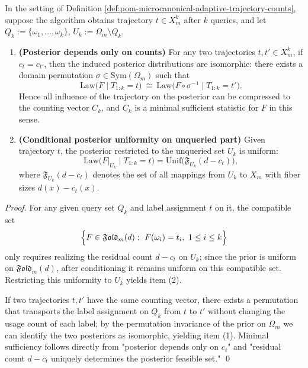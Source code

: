 \begin{theorem}\label{thm:pom-microcanonical-count-sufficient-statistic-posterior-uniform}
In the setting of Definition \ref{def:pom-microcanonical-adaptive-trajectory-counts}, suppose the algorithm obtains trajectory \(t\in X_m^k\) after \(k\) queries, and let \(Q_k:=\{\omega_1,\dots,\omega_k\}\),
\(U_k:=\Omega_m\setminus Q_k\).
\begin{enumerate}
  \item \textbf{(Posterior depends only on counts)}
  For any two trajectories \(t,t'\in X_m^k\), if \(c_t=c_{t'}\), then the induced posterior distributions are isomorphic:
  there exists a domain permutation \(\sigma\in\mathrm{Sym}(\Omega_m)\) such that
  \[
  \mathrm{Law}\bigl(F\mid T_{1:k}=t\bigr)\ \cong\ \mathrm{Law}\bigl(F\circ\sigma^{-1}\mid T_{1:k}=t'\bigr).
  \]
  Hence all influence of the trajectory on the posterior can be compressed to the counting vector \(C_k\), and \(C_k\) is a minimal sufficient statistic for \(F\) in this sense.
  \item \textbf{(Conditional posterior uniformity on unqueried part)}
  Given trajectory \(t\), the posterior restricted to the unqueried set \(U_k\) is uniform:
  \[
  \mathrm{Law}\bigl(F|_{U_k}\mid T_{1:k}=t\bigr)
  =\mathrm{Unif}\bigl(\mathfrak{F}_{U_k}(d-c_t)\bigr),
  \]
  where \(\mathfrak{F}_{U_k}(d-c_t)\) denotes the set of all mappings from \(U_k\) to \(X_m\) with fiber sizes \(d(x)-c_t(x)\).
\end{enumerate}
\end{theorem}
\begin{proof}
For any given query set \(Q_k\) and label assignment \(t\) on it, the compatible set
\[
\Bigl\{F\in\mathfrak{Fold}_m(d):\ F(\omega_i)=t_i,\ 1\le i\le k\Bigr\}
\]
only requires realizing the residual count \(d-c_t\) on \(U_k\);
since the prior is uniform on \(\mathfrak{Fold}_m(d)\), after conditioning it remains uniform on this compatible set.
Restricting this uniformity to \(U_k\) yields item (2).
\par
If two trajectories \(t,t'\) have the same counting vector, there exists a permutation that transports the label assignment on \(Q_k\) from \(t\) to \(t'\) without changing the usage count of each label;
by the permutation invariance of the prior on \(\Omega_m\) we can identify the two posteriors as isomorphic, yielding item (1).
Minimal sufficiency follows directly from "posterior depends only on \(c_t\)" and "residual count \(d-c_t\) uniquely determines the posterior feasible set." \qed
\end{proof}

\endinput

